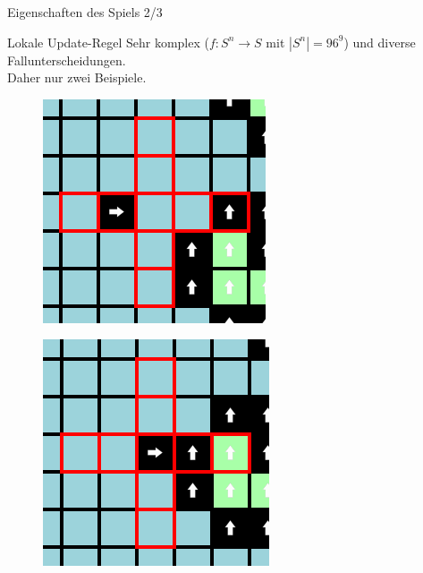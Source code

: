 \documentclass[aspectratio=169]{beamer}
\begin{document}
  \begin{frame}{Eigenschaften des Spiels 2/3}
    \begin{block}{Lokale Update-Regel}
      Sehr komplex ($f: S^n \to S$ mit $|S^n| = 96^9$) und diverse Fallunterscheidungen. \\
      Daher nur zwei Beispiele.
    \end{block}

    \pause

    \begin{multicols*}{3}

      \begin{figure}[H]
        \centering
        \includegraphics[width = 0.39 \textheight]{example1n_1.png}
      \end{figure}

      \vfill\null

      \pause

      \begin{figure}[H]
        \centering
        \includegraphics[width = 0.39 \textheight]{example1n_2.png}
      \end{figure}

      \vfill\null

      \pause



\end{multicols*}
\end{frame}
\end{document}

